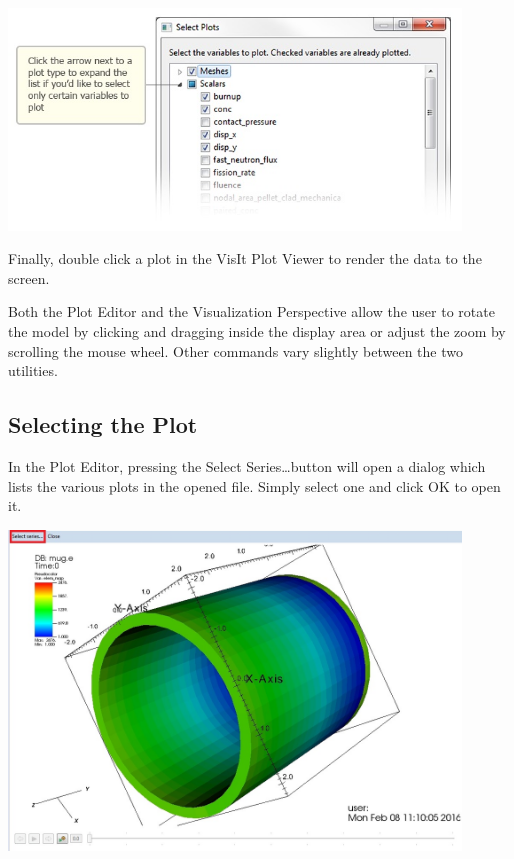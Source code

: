 \begin{center}
\includegraphics[width=12cm]{images/VisualizationSelectPlots}
\end{center}

Finally, double click a plot in the VisIt Plot Viewer to render the data to the
screen.

Both the Plot Editor and the Visualization Perspective allow the user to rotate
the model by clicking and dragging inside the display area or adjust the zoom by
scrolling the mouse wheel. Other commands vary slightly between the two
utilities.

\subsection{Selecting the Plot}

In the Plot Editor, pressing the Select Series\ldots button will open a dialog
which lists the various plots in the opened file. Simply select one and click OK
to open it. 

\begin{center}
\includegraphics[width=12cm]{images/PlotEditorSelectSeriesButton}
\end{center}

